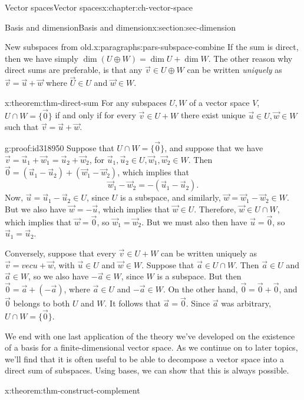 \documentclass[oneside,10pt,]{book}
\numberwithin{equation}{section}
\begin{document}
\begin{chapterptx}{Vector spaces}{}{Vector spaces}{}{}{x:chapter:ch-vector-space}
\begin{sectionptx}{Basis and dimension}{}{Basis and dimension}{}{}{x:section:sec-dimension}
\begin{paragraphs}{New subspaces from old.}{x:paragraphs:pars-subspace-combine}
If the sum is direct, then we have simply \(\dim(U\oplus W) = \dim U + \dim W\). The other reason why direct sums are preferable, is that any \(\vec{v}\in U\oplus W\) can be written \emph{uniquely} as \(\vec{v}=\vec{u}+\vec{w}\) where \(\vec{U}\in U\) and \(\vec{w}\in W\).%
\begin{theorem}{}{}{x:theorem:thm-direct-sum}%
For any subspaces \(U,W\) of a vector space \(V\), \(U\cap W = \{\vec{0}\}\) if and only if for every \(\vec{v}\in U+W\) there exist unique \(\vec{u}\in U, \vec{w}\in W\) such that \(\vec{v}=\vec{u}+\vec{w}\).%
\end{theorem}
\begin{proofptx}{}{g:proof:id318950}
Suppose that \(U\cap W = \{\vec{0}\}\), and suppose that we have \(\vec{v} = \vec{u}_1+\vec{w}_1 = \vec{u}_2+\vec{w}_2\), for \(\vec{u}_1,\vec{u}_2\in U,\vec{w}_1,\vec{w}_2\in W\). Then \(\vec{0}=(\vec{u}_1-\vec{u}_2)+(\vec{w}_1-\vec{w}_2)\), which implies that%
\begin{equation*}
\vec{w}_1-\vec{w}_2 = -(\vec{u}_1-\vec{u}_2)\text{.}
\end{equation*}
Now, \(\vec{u}=\vec{u}_1-\vec{u}_2\in U\), since \(U\) is a subspace, and similarly, \(\vec{w}=\vec{w}_1-\vec{w}_2\in W\). But we also have \(\vec{w}=-\vec{u}\), which implies that \(\vec{w}\in U\). Therefore, \(\vec{w}\in U\cap W\), which implies that \(\vec{w}=\vec{0}\), so \(\vec{w}_1=\vec{w}_2\). But we must also then have \(\vec{u}=\vec{0}\), so \(\vec{u}_1=\vec{u}_2\).%
\par
Conversely, suppose that every \(\vec{v}\in U+W\) can be written uniquely as \(\vec{v}=vec{u}+\vec{w}\), with \(\vec{u}\in U\) and \(\vec{w}\in W\). Suppose that \(\vec{a}\in U\cap W\). Then \(\vec{a}\in U\) and \(\vec{a}\in W\), so we also have \(-\vec{a}\in W\), since \(W\) is a subspace. But then \(\vec{0}=\vec{a}+(-\vec{a})\), where \(\vec{a}\in U\) and \(-\vec{a}\in W\). On the other hand, \(\vec{0}=\vec{0}+\vec{0}\), and \(\vec{0}\) belongs to both \(U\) and \(W\). It follows that \(\vec{a}=\vec{0}\). Since \(\vec{a}\) was arbitrary, \(U\cap W = \{\vec{0}\}\).%
\end{proofptx}
We end with one last application of the theory we've developed on the existence of a basis for a finite-dimensional vector space. As we continue on to later topics, we'll find that it is often useful to be able to decompose a vector space into a direct sum of subspaces. Using bases, we can show that this is always possible.%
\begin{theorem}{}{}{x:theorem:thm-construct-complement}%

\end{theorem}
\end{paragraphs}
\end{sectionptx}
\end{chapterptx}
\end{document}
